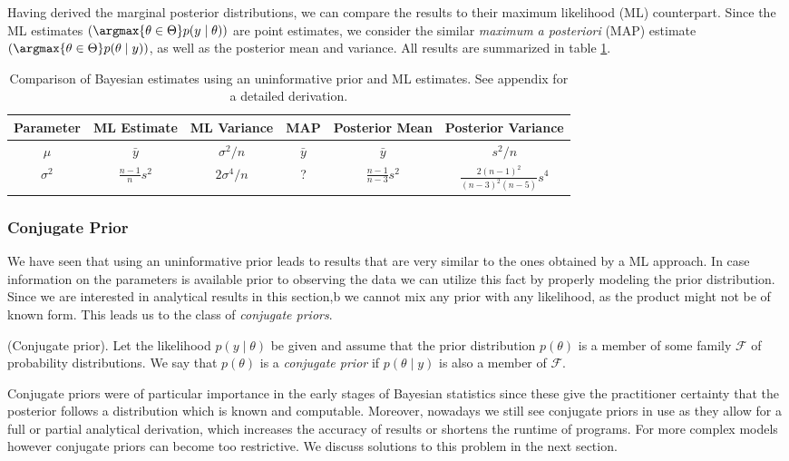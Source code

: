 Having derived the marginal posterior distributions, we can compare the results to their maximum likelihood (ML) counterpart.
Since the ML estimates $\left(\argmax{\theta \in \Theta}p(y \mid \theta)\right)$ are point estimates, we consider the similar \emph{maximum a posteriori} (MAP) estimate $\left(\argmax{\theta \in \Theta} p(\theta \mid y)\right)$, as well as the posterior mean and variance. All results are summarized in table \ref{table:comp_uniform_bay_ml}.

\begin{table}[ht]
\centering
\def\arraystretch{1.3}
{\small
 \begin{tabular}{c c c c c c}
 Parameter & ML Estimate & ML Variance & MAP & Posterior Mean & Posterior Variance\\[0.5ex]
 \hline
 $\mu$ & $\bar{y}$ & $\sigma^2/n$ & $\bar{y}$ & $\bar{y}$ & $s^2 / n$\\
 $\sigma^2$ & $\frac{n-1}{n} s^2$ & $2 \sigma^4 /n$ & ? & $\frac{n-1}{n-3} s^2$ & $\frac{2 (n-1)^2}{(n-3)^2 (n-5)} s^4$\\
 \end{tabular}
 }
\caption{\small {Comparison of Bayesian estimates using an uninformative prior and ML estimates. See appendix for a detailed derivation.}}
\label{table:comp_uniform_bay_ml}
\end{table}


\subsubsection*{Conjugate Prior}
We have seen that using an uninformative prior leads to results that are very similar to the ones obtained by a ML approach.
In case information on the parameters is available prior to observing the data we can utilize this fact by properly modeling the prior distribution.
Since we are interested in analytical results in this section,b we cannot mix any prior with any likelihood, as the product might not be of known form.
This leads us to the class of \emph{conjugate priors}.

\begin{definition}{(Conjugate prior).}
Let the likelihood $p(y \mid \theta)$ be given and assume that the prior distribution $p(\theta)$ is a member of some family $\mathcal{F}$ of probability distributions. We say that $p(\theta)$ is a \emph{conjugate prior} if $p(\theta \mid y)$ is also a member of $\mathcal{F}$.
\end{definition}

Conjugate priors were of particular importance in the early stages of Bayesian statistics since these give the practitioner certainty that the posterior follows a distribution which is known and computable. Moreover, nowadays we still see conjugate priors in use as they allow for a full or partial analytical derivation, which increases the accuracy of results or shortens the runtime of programs. For more complex models however conjugate priors can become too restrictive. We discuss solutions to this problem in the next section.

